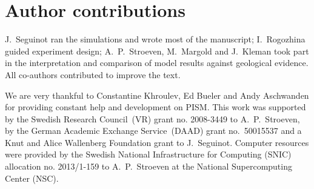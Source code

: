 \documentclass[tc]{copernicus}
\begin{document}
\section*{Author contributions}
J.~Seguinot ran the simulations and wrote most of the manuscript; I.~Rogozhina
guided experiment design; A.~P.~Stroeven, M.~Margold and J.~Kleman took part in
the interpretation and comparison of model results against geological evidence.
All co-authors contributed to improve the text.

\begin{acknowledgements}
We are very thankful to Constantine Khroulev, Ed Bueler and Andy Aschwanden for
providing constant help and development on PISM. This work was supported by the
Swedish Research Council~(VR) grant no. 2008-3449 to A.~P.~Stroeven, by the
German Academic Exchange Service~(DAAD) grant no.~50015537 and a Knut and Alice
Wallenberg Foundation grant to J.~Seguinot.
Computer resources were provided by the Swedish National
Infrastructure for Computing (SNIC) allocation no. 2013/1-159 to A.~P.~Stroeven
at the National Supercomputing Center (NSC).
\end{acknowledgements}



\newpage

\end{document}
